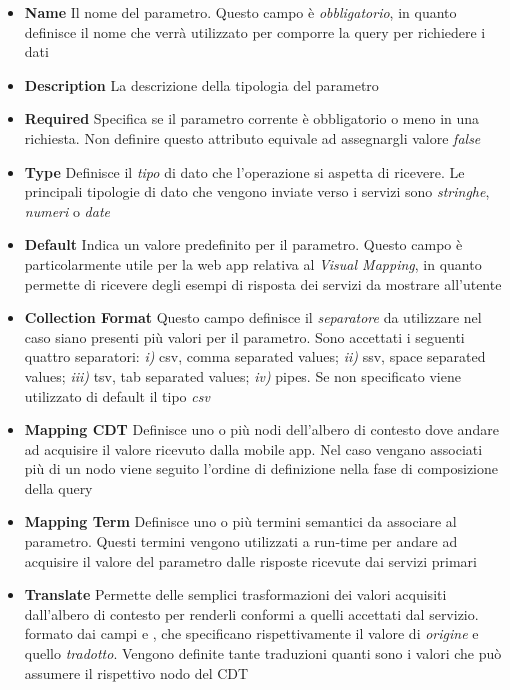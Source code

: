 \begin{itemize}
	\item \textbf{Name}
	Il nome del parametro. Questo campo è \emph{obbligatorio}, in quanto definisce il nome che verrà utilizzato per comporre la query per richiedere i dati
	\item \textbf{Description}
	La descrizione della tipologia del parametro
	\item \textbf{Required}
	Specifica se il parametro corrente è obbligatorio o meno in una richiesta. Non definire questo attributo equivale ad assegnargli valore \emph{false}
	\item \textbf{Type}
	Definisce il \emph{tipo} di dato che l'operazione si aspetta di ricevere. Le principali tipologie di dato che vengono inviate verso i servizi sono \emph{stringhe}, \emph{numeri} o \emph{date}
	\item \textbf{Default}
	Indica un valore predefinito per il parametro. Questo campo è particolarmente utile per la web app relativa al \emph{Visual Mapping}, in quanto permette di ricevere degli esempi di risposta dei servizi da mostrare all'utente
	\item \textbf{Collection Format}
	Questo campo definisce il \emph{separatore} da utilizzare nel caso siano presenti più valori per il parametro. Sono accettati i seguenti quattro separatori: \emph{i)} csv, comma separated values; \emph{ii)} ssv, space separated values; \emph{iii)} tsv, tab separated values; \emph{iv)} pipes. Se non specificato viene utilizzato di default il tipo \emph{csv}
	\item \textbf{Mapping CDT}
	Definisce uno o più nodi dell'albero di contesto dove andare ad acquisire il valore ricevuto dalla mobile app. Nel caso vengano associati più di un nodo viene seguito l'ordine di definizione nella fase di composizione della query
	\item \textbf{Mapping Term}
	Definisce uno o più termini semantici da associare al parametro. Questi termini vengono utilizzati a run-time per andare ad acquisire il valore del parametro dalle risposte ricevute dai servizi primari
	\item \textbf{Translate}
	Permette delle semplici trasformazioni dei valori acquisiti dall'al\-be\-ro di contesto per renderli conformi a quelli accettati dal servizio. \upe formato dai campi  e , che specificano rispettivamente il valore di \emph{origine} e quello \emph{tradotto}. Vengono definite tante traduzioni quanti sono i valori che può assumere il rispettivo nodo del CDT
\end{itemize}

